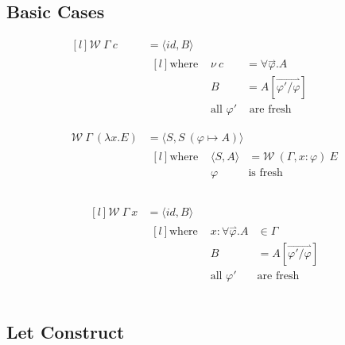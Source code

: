 \subsection{Basic Cases}
\begin{minipage}{.5\textwidth}
	\[\begin{matrix*}[l]
			\mathcal{W} \ \Gamma \ c & = \langle id, B \rangle \\
			& \begin{matrix*}[l]
				\text{where } & \nu \ c & = \forall \overset{\rightharpoonup}{\varphi} . A \\
				& B & = A [\overset{\rightharpoonup}{\varphi' / \varphi}] \\
				& \text{all } \varphi' & \text{ are fresh} \\
			\end{matrix*} \\
			\\
			\mathcal{W} \ \Gamma \ (\lambda x . E) & = \langle S , S \ (\varphi \mapsto A) \rangle \\
			& \begin{matrix*}[l]
				\text{where } & \langle S, A \rangle &= \mathcal{W} \ (\Gamma, x:\varphi) \ E \\
				& \varphi & \text{is fresh} \\
			\end{matrix*} \\
		\end{matrix*}\]
\end{minipage}
\vline
\begin{minipage}{.5\textwidth}
	\[\begin{matrix*}[l]
			\mathcal{W} \ \Gamma \ x & = \langle id, B \rangle \\
			& \begin{matrix*}[l]
				\text{where } & x:\forall \overset{\rightharpoonup}{\varphi} . A & \in \Gamma \\
				& B & = A [\overset{\rightharpoonup}{\varphi' / \varphi}] \\
				& \text{all } \varphi' & \text{are fresh} \\
			\end{matrix*} \\
		\end{matrix*}\]
\end{minipage}

\subsection{Let Construct}

